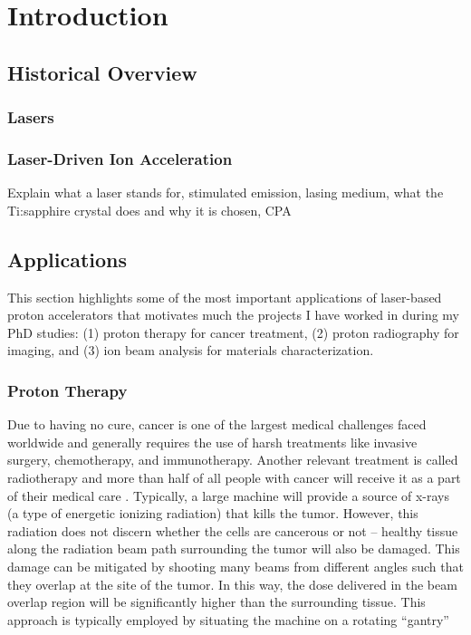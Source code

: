 \chapter{Introduction}

\section{Historical Overview}

\subsection{Lasers}

\subsection{Laser-Driven Ion Acceleration}

Explain what a laser stands for, stimulated emission, lasing medium, what the Ti:sapphire crystal does and why it is chosen, CPA


\section{Applications}

This section highlights some of the most important applications of laser-based proton accelerators that motivates much the projects I have worked in during my PhD studies: (1) proton therapy for cancer treatment, (2) proton radiography for imaging, and (3) ion beam analysis for materials characterization.


\subsection{Proton Therapy}

Due to having no cure, cancer is one of the largest medical challenges faced worldwide and generally requires the use of harsh treatments like invasive surgery, chemotherapy, and immunotherapy. Another relevant treatment is called radiotherapy and more than half of all people with cancer will receive it as a part of their medical care \cite{Mayo_2024_Cancer}. Typically, a large machine will provide a source of x-rays (a type of energetic ionizing radiation) that kills the tumor. However, this radiation does not discern whether the cells are cancerous or not -- healthy tissue along the radiation beam path surrounding the tumor will also be damaged. This damage can be mitigated by shooting many beams from different angles such that they overlap at the site of the tumor. In this way, the dose delivered in the beam overlap region will be significantly higher than the surrounding tissue. This approach is typically employed by situating the machine on a rotating ``gantry''

